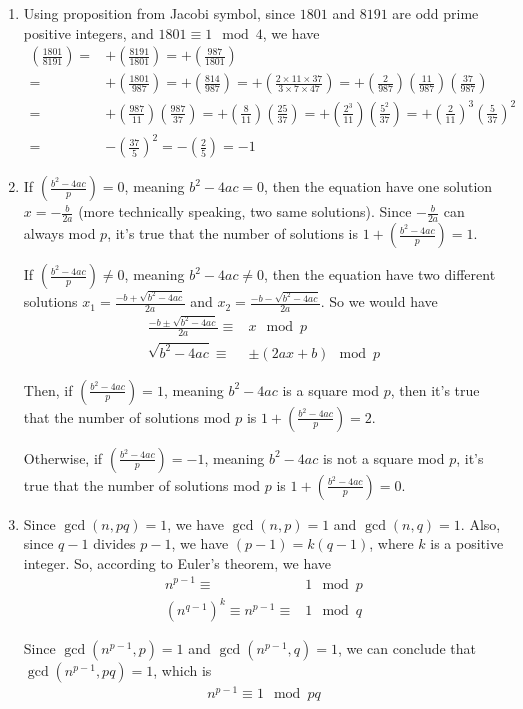 \documentclass[11pt,a4paper]{article}
\begin{document}
\begin{enumerate}
\item Using proposition from Jacobi symbol, since $1801$ and $8191$ are odd prime positive integers, and $1801 \equiv 1 \mod 4$, we have
\begin{align*}
	\left(\frac{1801}{8191}\right) =& + \left(\frac{8191}{1801}\right) = + \left(\frac{987}{1801}\right) \\
	=& + \left(\frac{1801}{987}\right) = + \left(\frac{814}{987}\right) = + \left(\frac{2\times11\times37}{3\times7\times47}\right) = + \left(\frac{2}{987}\right)\left(\frac{11}{987}\right)\left(\frac{37}{987}\right) \\
	=& + \left(\frac{987}{11}\right)\left(\frac{987}{37}\right) = + \left(\frac{8}{11}\right)\left(\frac{25}{37}\right) = + \left(\frac{2^{3}}{11}\right)\left(\frac{5^{2}}{37}\right) = + \left(\frac{2}{11}\right)^{3}\left(\frac{5}{37}\right)^{2} \\
	=& - \left(\frac{37}{5}\right)^{2} = - \left(\frac{2}{5}\right) = -1
\end{align*}

\item If $\left(\frac{b^{2}-4ac}{p}\right) = 0$, meaning $b^{2}-4ac = 0$, then the equation have one solution $x = -\frac{b}{2a}$ (more technically speaking, two same solutions). Since $-\frac{b}{2a}$ can always mod $p$, it's true that the number of solutions is $1 + \left(\frac{b^{2}-4ac}{p}\right) = 1$.
\par If $\left(\frac{b^{2}-4ac}{p}\right) \neq 0$, meaning $b^{2}-4ac \neq 0$, then the equation have two different solutions $x_{1} = \frac{-b+\sqrt{b^{2}-4ac}}{2a}$ and $x_{2} = \frac{-b-\sqrt{b^{2}-4ac}}{2a}$. So we would have
\begin{align*}
	\frac{-b\pm\sqrt{b^{2}- 4ac}}{2a} \equiv& x \mod p \\
	\sqrt{b^{2}-4ac} \equiv& \pm(2ax+b) \mod p
\end{align*}
\par Then, if $\left(\frac{b^{2}-4ac}{p}\right) = 1$, meaning $b^{2}-4ac$ is a square mod $p$, then it's true that the number of solutions mod $p$ is $1+\left(\frac{b^{2}-4ac}{p}\right) = 2$.
\par Otherwise, if $\left(\frac{b^{2}-4ac}{p}\right) = -1$, meaning $b^{2}-4ac$ is not a square mod $p$, it's true that the number of solutions mod $p$ is $1+\left(\frac{b^{2}-4ac}{p}\right) = 0$.

\item Since $\gcd(n, pq) = 1$, we have $\gcd(n,p) = 1$ and $\gcd(n,q) = 1$. Also, since $q-1$ divides $p-1$, we have $(p-1) = k(q-1)$, where $k$ is a positive integer. So, according to Euler's theorem, we have
\begin{align*}
	n^{p-1} \equiv& 1 \mod p \\
	(n^{q-1})^{k} \equiv n^{p-1} \equiv& 1 \mod q
\end{align*}
\par Since $\gcd(n^{p-1}, p) = 1$ and $\gcd(n^{p-1}, q) = 1$, we can conclude that $\gcd(n^{p-1}, pq) = 1$, which is
\begin{align*}
	n^{p-1} \equiv 1 \mod pq
\end{align*}


\end{enumerate}
\end{document}
